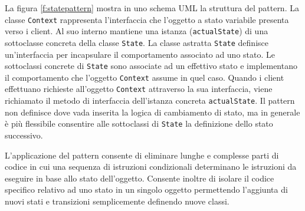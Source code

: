 La figura \ref{f:statepattern} mostra in uno schema \ac{UML} la struttura del pattern. La classe \texttt{Context} rappresenta l'interfaccia che l'oggetto a stato variabile presenta verso i client. Al suo interno mantiene una istanza (\texttt{actualState}) di una sottoclasse concreta della classe \texttt{State}.
La classe astratta \texttt{State} definisce un'interfaccia per incapsulare il comportamento associato ad uno stato.
Le sottoclassi concrete di \texttt{State} sono associate ad un effettivo stato e implementano il comportamento che l'oggetto \texttt{Context} assume in quel caso.
Quando i client effettuano richieste all'oggetto \texttt{Context} attraverso la sua interfaccia, viene richiamato il metodo di interfaccia dell'istanza concreta \texttt{actualState}.
Il pattern non definisce dove vada inserita la logica di cambiamento di stato, ma in generale \`e pi\`u flessibile consentire alle sottoclassi di \texttt{State} la definizione dello stato successivo.

L'applicazione del pattern consente di eliminare lunghe e complesse parti di codice in cui una sequenza di istruzioni condizionali determinano le istruzioni da eseguire in base allo stato dell'oggetto. Consente inoltre di isolare il codice specifico relativo ad uno stato in un singolo oggetto permettendo l'aggiunta di nuovi stati e transizioni semplicemente definendo nuove classi.